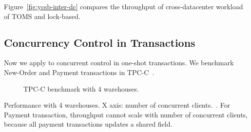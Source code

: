 Figure~\ref{fig:ycsb-inter-dc} compares the throughput of cross-datacenter workload of TOMS and lock-based.
\fi

\subsection{Concurrency Control in Transactions}
\label{subsec:eval-transactions}

Now we apply \sys to concurrent control in one-shot transactions.
We benchmark New-Order and Payment transactions in TPC-C~\cite{tpcc}.


\begin{figure}[t]
\centering
	\hspace{0.02\textwidth}
    \hspace{0.02\textwidth}
\caption{TPC-C benchmark with 4 warehouses.}
\label{fig:tpc-c}
\end{figure}

Performance with 4 warehouses.
X axis: number of concurrent clients.~\cite{yu2014staring}.
For Payment transaction, throughput cannot scale with number of concurrent clients, because all payment transactions updates a shared field.

